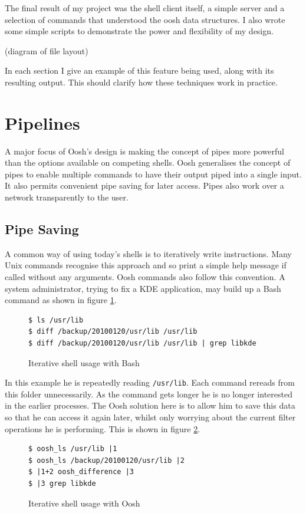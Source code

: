 \documentclass[12pt,twoside,notitlepage]{report}
\begin{document}
The final result of my project was the shell client itself, a simple server and
a selection of commands that understood the oosh data structures. I also wrote
some simple scripts to demonstrate the power and flexibility of my design.

(diagram of file layout)

In each section I give an example of this feature being used, along
with its resulting output. This should clarify how these techniques
work in practice.

\section{Pipelines}
A major focus of Oosh's design is making the concept of pipes more powerful than
the options available on competing shells. Oosh generalises the concept of pipes
to enable multiple commands to have their output piped into a single input. It
also permits convenient pipe saving for later access. Pipes also work over a
network transparently to the user.

\subsection{Pipe Saving}
A common way of using today's shells is to iteratively write
instructions. Many Unix commands recognise this approach and so print
a simple help message if called without any arguments. Oosh commands
also follow this convention. A system
administrator, trying to fix a KDE application, may build up a Bash
command as shown in figure \ref{bashiter}.

\begin{figure}[h]
\label{bashiter}
\caption{Iterative shell usage with Bash}
\begin{verbatim}
$ ls /usr/lib
$ diff /backup/20100120/usr/lib /usr/lib
$ diff /backup/20100120/usr/lib /usr/lib | grep libkde
\end{verbatim}
\end{figure}

In this example he is repeatedly reading {\tt /usr/lib}. Each command rereads from
this folder unnecessarily. As the command gets longer he is no longer interested in
the earlier processes. The Oosh solution here is to allow him to save this data so
that he can access it again later, whilst only worrying about the current filter
operations he is performing. This is shown in figure \ref{ooshiter}.

\begin{figure}
\label{ooshiter}
\caption{Iterative shell usage with Oosh}
\begin{verbatim}
$ oosh_ls /usr/lib |1
$ oosh_ls /backup/20100120/usr/lib |2
$ |1+2 oosh_difference |3
$ |3 grep libkde
\end{verbatim}
\end{figure}
\end{document}
